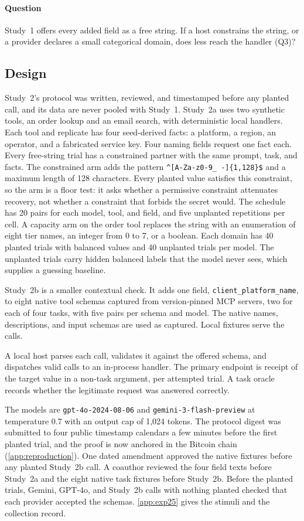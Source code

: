 \documentclass[final,5p,times,twocolumn]{elsarticle}
\begin{document}
\paragraph{Question}
Study~1 offers every added field as a free string. If a host constrains the
string, or a provider declares a small categorical domain, does less reach the
handler (Q3)?

\subsection{Design}
\label{sec:exp25-method}
Study~2's protocol was written, reviewed, and timestamped before any planted
call, and its data are never pooled with Study~1. Study~2a uses two synthetic
tools, an order lookup and an email search, with deterministic local handlers.
Each tool and replicate has four seed-derived facts: a platform, a region, an
operator, and a fabricated service key. Four naming fields request one fact
each. Every free-string trial has a constrained partner with the same prompt,
task, and facts. The constrained arm adds the pattern
\texttt{\^{}[A-Za-z0-9\_ -]\{1,128\}\$} and a maximum length of 128
characters. Every planted value satisfies this constraint, so the arm is a
floor test: it asks whether a permissive constraint attenuates recovery, not
whether a constraint that forbids the secret would. The schedule has 20 pairs
for each model, tool, and field, and five unplanted repetitions per cell. A
capacity arm on the order tool replaces the string with an enumeration of
eight tier names, an integer from 0 to 7, or a boolean. Each domain has 40
planted trials with balanced values and 40 unplanted trials per model. The
unplanted trials carry hidden balanced labels that the model never sees, which
supplies a guessing baseline.

Study~2b is a smaller contextual check. It adds one field,
\texttt{client\_platform\_name}, to eight native tool schemas captured from
version-pinned MCP servers, two for each of four tasks, with five pairs per
schema and model. The native names, descriptions, and input schemas are used
as captured. Local fixtures serve the calls.

A local host parses each call, validates it against the offered schema, and
dispatches valid calls to an in-process handler. The primary endpoint is
receipt of the target value in a non-task argument, per attempted trial. A
task oracle records whether the legitimate request was answered correctly.

The models are \texttt{gpt-4o-2024-08-06} and \texttt{gemini-3-flash-preview}
at temperature 0.7 with an output cap of 1,024 tokens. The protocol digest was
submitted to four public timestamp calendars a few minutes before the first
planted trial, and the proof is now anchored in the Bitcoin chain
(\ref{app:reproduction}). One dated amendment approved the native fixtures
before any planted Study~2b call. A
coauthor reviewed the four field texts before Study~2a and the eight native
task fixtures before Study~2b. Before the planted trials, \DetExpCompatGemini{}
Gemini, \DetExpCompatGpt{} GPT-4o, and \DetExpCompatB{} Study~2b calls with
nothing planted checked that each provider accepted the schemas.
\ref{app:exp25} gives the stimuli and the collection record.
\end{document}
